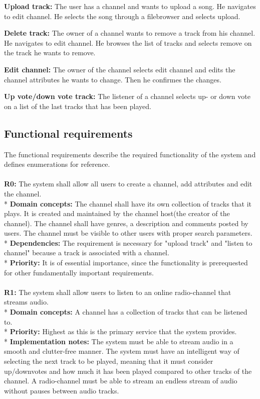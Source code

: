 \documentclass[a4paper,11pt,report]{article}
\begin{document}
\textbf{Upload track:}
The user has a channel and wants to upload a song. He navigates to edit channel. He selects the song through a filebrowser and selects upload.

\textbf{Delete track:}
The owner of a channel wants to remove a track from his channel. He navigates to edit channel. He browses the list of tracks and selects remove on the track he wants to remove.

\textbf{Edit channel:}
The owner of the channel selects edit channel and edits the channel attributes he wants to change. Then he confirmes the changes.

\textbf{Up vote/down vote track:}
The listener of a channel selects up- or down vote on a list of the last tracks that has been played.

\subsection{Functional requirements}
The functional requirements describe the required functionality of the system and defines enumerations for reference.
\\ \\
\textbf{R0:}
The system shall allow all users to create a channel, add attributes and edit the channel. \\*
\textbf{Domain concepts:}
The channel shall have its own collection of tracks that it plays. It is created and maintained by the channel host(the creator of the channel).
The channel shall have genres, a description and comments posted by users.
The channel must be visible to other users with proper search parameters. \\*
\textbf{Dependencies:} 
The requirement is necessary for "upload track" and "listen to channel" because a track is associated with a channel. \\*
\textbf{Priority:} 
It is of essential importance, since the functionality is prerequested for other fundamentally important requirements.
\\ \\

\textbf{R1:}
The system shall allow users to listen to an online radio-channel that streams audio. \\*
\textbf{Domain concepts:}
A channel has a collection of tracks that can be listened to. \\*
\textbf{Priority:}
Highest as this is the primary service that the system provides. \\*
\textbf{Implementation notes:}
The system must be able to stream audio in a smooth and clutter-free manner. The system must have an intelligent way of selecting the next track to be played, meaning that it must consider up/downvotes and how much it has been played compared to other tracks of the channel.
A radio-channel must be able to stream an endless stream of audio without pauses between audio tracks.
\\ \\
\end{document}
